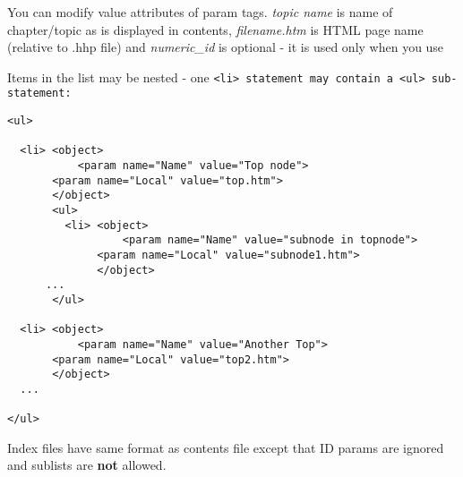 You can modify value attributes of param tags. {\it topic name} is name of chapter/topic as is displayed in
contents, {\it filename.htm} is HTML page name (relative to .hhp file) and {\it numeric\_id} is optional 
- it is used only when you use 

Items in the list may be nested - one \tt{<li>} statement may contain a \tt{<ul>} sub-statement:

\begin{verbatim}
<ul>

  <li> <object>
           <param name="Name" value="Top node">
	   <param name="Local" value="top.htm">
       </object>
       <ul>
         <li> <object>
                  <param name="Name" value="subnode in topnode">
	          <param name="Local" value="subnode1.htm">
              </object>
	  ...
       </ul>
       
  <li> <object>
           <param name="Name" value="Another Top">
	   <param name="Local" value="top2.htm">
       </object>
  ...    

</ul>
\end{verbatim}


Index files have same format as contents file except that ID params are ignored and sublists are {\bf not} 
allowed.

